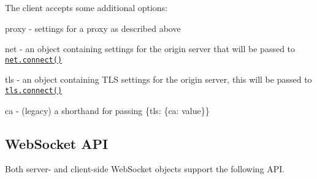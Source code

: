 The client accepts some additional options\+:


\begin{DoxyItemize}
\item {\ttfamily proxy} -\/ settings for a proxy as described above
\item {\ttfamily net} -\/ an object containing settings for the origin server that will be passed to \href{https://nodejs.org/api/net.html#net_socket_connect_options_connectlistener}{\tt {\ttfamily net.\+connect()}}
\item {\ttfamily tls} -\/ an object containing T\+LS settings for the origin server, this will be passed to \href{https://nodejs.org/api/tls.html#tls_tls_connect_options_callback}{\tt {\ttfamily tls.\+connect()}}
\item {\ttfamily ca} -\/ (legacy) a shorthand for passing {\ttfamily \{tls\+: \{ca\+: value\}\}}
\end{DoxyItemize}

\subsection*{Web\+Socket A\+PI}

Both server-\/ and client-\/side {\ttfamily Web\+Socket} objects support the following A\+PI.


